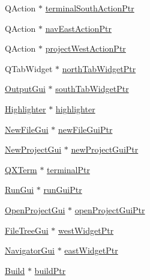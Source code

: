 \begin{DoxyCompactItemize}
Q\-Action $\ast$ \hyperlink{class_master_actions_ad96c9f17230e162e9a9f39a867101a53}{terminal\-South\-Action\-Ptr}
\item 
Q\-Action $\ast$ \hyperlink{class_master_actions_aa084a718ec328fbb6645bdb23c995df1}{nav\-East\-Action\-Ptr}
\item 
Q\-Action $\ast$ \hyperlink{class_master_actions_aa4160469d2e9a840448c49e95bcfa9e5}{project\-West\-Action\-Ptr}
\item 
Q\-Tab\-Widget $\ast$ \hyperlink{class_master_actions_a4fbb50c5700fd6b66ace4cff6d3bde3e}{north\-Tab\-Widget\-Ptr}
\item 
\hyperlink{class_output_gui}{Output\-Gui} $\ast$ \hyperlink{class_master_actions_a0cbcc4a5b82537a3f958c462bcaade46}{south\-Tab\-Widget\-Ptr}
\item 
\hyperlink{class_highlighter}{Highlighter} $\ast$ \hyperlink{class_master_actions_a50b1565db8b7780ec4e88e59953aa67b}{highlighter}
\item 
\hyperlink{class_new_file_gui}{New\-File\-Gui} $\ast$ \hyperlink{class_master_actions_a8839c174acf071c0d9bfe450160218eb}{new\-File\-Gui\-Ptr}
\item 
\hyperlink{class_new_project_gui}{New\-Project\-Gui} $\ast$ \hyperlink{class_master_actions_a78733336a3d5fd3bbb55eaf0215f0d40}{new\-Project\-Gui\-Ptr}
\item 
\hyperlink{class_q_x_term}{Q\-X\-Term} $\ast$ \hyperlink{class_master_actions_a540ec48ffb8bc7955f5630fac7b3865b}{terminal\-Ptr}
\item 
\hyperlink{class_run_gui}{Run\-Gui} $\ast$ \hyperlink{class_master_actions_ad7ff295f2e3067697e290afc4f0fd0df}{run\-Gui\-Ptr}
\item 
\hyperlink{class_open_project_gui}{Open\-Project\-Gui} $\ast$ \hyperlink{class_master_actions_a6caf7325dd9cb26f72c81a8c877db634}{open\-Project\-Gui\-Ptr}
\item 
\hyperlink{class_file_tree_gui}{File\-Tree\-Gui} $\ast$ \hyperlink{class_master_actions_a84f8a14213e1f05a00f1855b41a973de}{west\-Widget\-Ptr}
\item 
\hyperlink{class_navigator_gui}{Navigator\-Gui} $\ast$ \hyperlink{class_master_actions_a24c61c608d67e766f996d3a430a7bae0}{east\-Widget\-Ptr}
\item 
\hyperlink{class_build}{Build} $\ast$ \hyperlink{class_master_actions_a204854f9bf284e221292497cdb7182ab}{build\-Ptr}
\end{DoxyCompactItemize}



